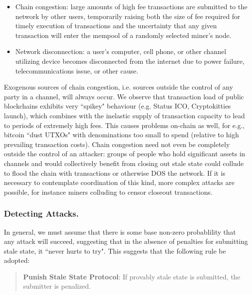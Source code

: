 \documentclass[prb,floatfix,reprint,nofootinbib,amsmath,amssymb,epsfig,pre,floats,letterpaper,groupedaffiliation,tightenlines,allcolors=blue,11pt]{revtex4}
\theoremstyle{definition}
\theoremstyle{definition}
\theoremstyle{definition}
\begin{document}
\begin{itemize}
\item Chain congestion: large amounts of high fee transactions are submitted to the network by other users, temporarily raising both the size of fee required for timely execution of transactions and the uncertainty that any given transaction will enter the mempool of a randomly selected miner's node.
\item Network disconnection: a user's computer, cell phone, or other channel utilizing device becomes disconnected from the internet due to power failure, telecommunications issue, or other cause.
\end{itemize}

Exogenous sources of chain congestion, i.e. sources outside the control of any party in a channel, will always occur. We observe that transaction load of public blockchains exhibits very ``spikey" behaviour (e.g. Status ICO, Cryptokitties launch), which combines with the inelastic supply of transaction capacity to lead to periods of extremely high fees. This causes problems on-chain as well, for e.g., bitcoin ``dust UTXOs" \cite{alcio:dust} with denominations too small to spend (relative to high prevailing transaction costs). Chain congestion need not even be completely outside the control of an attacker: groups of people who hold significant assets in channels and would collectively benefit from closing out stale state could collude to flood the chain with transactions or otherwise DOS the network. If it is necessary to contemplate coordination of this kind, more complex attacks are possible, for instance miners colluding to censor closeout transactions.

\subsubsection{Detecting Attacks.} \label{sec:detectingattacks} In general, we must assume that there is some base non-zero probablility that any attack will succeed, suggesting that in the absence of penalties for submitting stale state, it ``never hurts to try". This suggests that the following rule be adopted:

\begin{quote}
\textbf{Punish Stale State Protocol}: If provably stale state is submitted, the submitter is penalized.
\end{quote}
\end{document}
